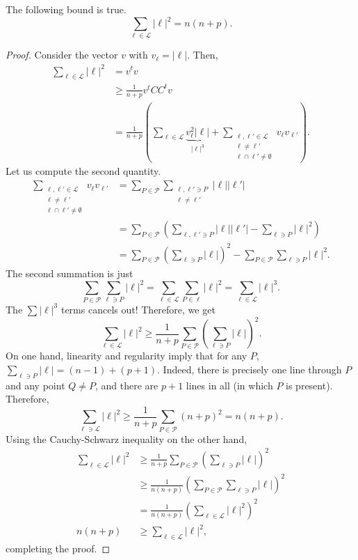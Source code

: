 \documentclass{article}
\begin{document}
	\begin{prop}
		The following bound is true.
		\[ \sum_{\ell \in \mathcal{L}} |\ell|^2 = n(n+p). \]
	\end{prop}
	\begin{proof}
		Consider the vector $v$ with $v_{\ell} = |\ell|$. Then,
		\begin{align*}
			\sum_{\ell \in \mathcal{L}} |\ell|^2 &= v^t v \\
				&\ge \frac{1}{n+p} v^t CC^t v \\
				&= \frac{1}{n+p} \left( \sum_{\ell \in \mathcal{L}} \underbrace{v_\ell^2 |\ell|}_{|\ell|^3} + \sum_{\substack{\ell,\ell' \in \mathcal{L} \\ \ell \ne \ell' \\ \ell \cap \ell' \ne \emptyset}} v_{\ell} v_{\ell'}  \right).
		\end{align*}
		Let us compute the second quantity.
		\begin{align*}
			\sum_{\substack{\ell,\ell' \in \mathcal{L} \\ \ell \ne \ell' \\ \ell \cap \ell' \ne \emptyset}} v_{\ell} v_{\ell'} &= \sum_{P \in \mathcal{P}} \sum_{\substack{\ell,\ell' \ni P \\ \ell \ne \ell'}} |\ell||\ell'| \\
				&= \sum_{P \in \mathcal{P}} \left(\sum_{\ell,\ell' \ni P} |\ell||\ell'| - \sum_{\ell \ni P} |\ell|^2\right) \\
				&= \sum_{P \in \mathcal{P}} \left(\sum_{\ell \ni P} |\ell|\right)^2 - \sum_{P \in \mathcal{P}} \sum_{\ell \ni P} |\ell|^2 .
		\end{align*}
		The second summation is just
		\[ \sum_{P \in \mathcal{P}} \sum_{\ell \ni P} |\ell|^2 = \sum_{\ell \in \mathcal{L}} \sum_{P \in \ell} |\ell|^2 = \sum_{\ell \in \mathcal{L}} |\ell|^3. \]
		The $\sum|\ell|^3$ terms cancels out! Therefore, we get
		\[ \sum_{\ell \in \mathcal{L}} |\ell|^2 \ge \frac{1}{n+p} \sum_{P \in \mathcal{P}} \left(\sum_{\ell \ni P} |\ell|\right)^2. \]
		On one hand, linearity and regularity imply that for any $P$, $\sum_{\ell \ni P} |\ell| = (n-1) + (p+1)$. Indeed, there is precisely one line through $P$ and any point $Q \ne P$, and there are $p+1$ lines in all (in which $P$ is present). Therefore,
		\[ \sum_{\ell \ni \mathcal{L}} |\ell|^2 \ge \frac{1}{n+p} \sum_{P \in \mathcal{P}} (n+p)^2 = n(n+p). \]
		Using the Cauchy-Schwarz inequality on the other hand,
		\begin{align*}
		 	\sum_{\ell \in \mathcal{L}} |\ell|^2 &\ge \frac{1}{n+p} \sum_{P \in \mathcal{P}} \left(\sum_{\ell \ni P} |\ell|\right)^2 \\
		 		&\ge \frac{1}{n(n+p)} \left(\sum_{P \in \mathcal{P}} \sum_{\ell \ni P} |\ell|\right)^2 \\
		 		&= \frac{1}{n(n+p)} \left(\sum_{\ell \in \mathcal{L}} |\ell|^2\right)^2 \\
		 	n(n+p) &\ge \sum_{\ell \in \mathcal{L}} |\ell|^2,
		\end{align*}
		completing the proof.
	\end{proof}
\end{document}
